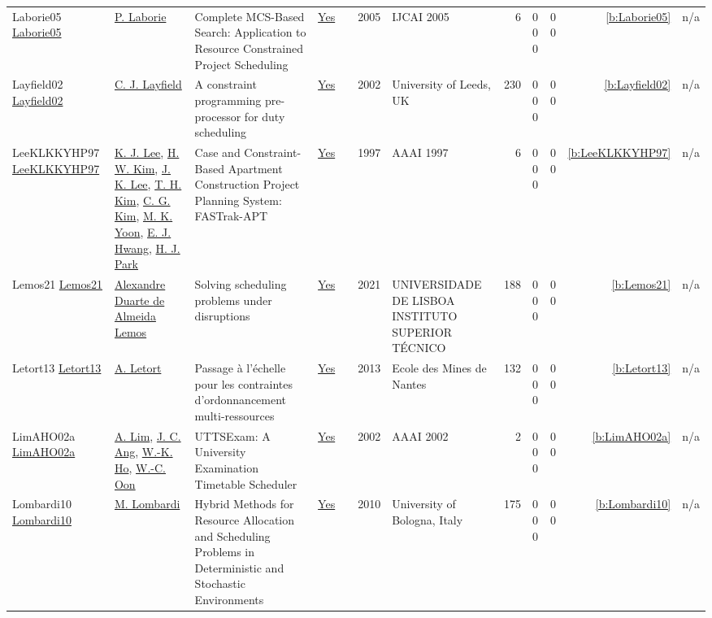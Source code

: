 {\begin{longtable}{>{\raggedright\arraybackslash}p{3cm}>{\raggedright\arraybackslash}p{4.5cm}>{\raggedright\arraybackslash}p{6.0cm}rrrp{2.5cm}rp{1cm}p{1cm}rr}
Laborie05 \href{http://ijcai.org/Proceedings/05/Papers/0571.pdf}{Laborie05} & \hyperref[auth:a118]{P. Laborie} & Complete MCS-Based Search: Application to Resource Constrained Project Scheduling & \href{../works/Laborie05.pdf}{Yes} & \cite{Laborie05} & 2005 & IJCAI 2005 & 6 & 0 0 0 & 0 0 & \ref{b:Laborie05} & n/a\\
Layfield02 \href{http://etheses.whiterose.ac.uk/1301/}{Layfield02} & \hyperref[auth:a670]{C. J. Layfield} & A constraint programming pre-processor for duty scheduling & \href{../works/Layfield02.pdf}{Yes} & \cite{Layfield02} & 2002 & University of Leeds, {UK} & 230 & 0 0 0 & 0 0 & \ref{b:Layfield02} & n/a\\
LeeKLKKYHP97 \href{http://www.aaai.org/Library/IAAI/1997/iaai97-182.php}{LeeKLKKYHP97} & \hyperref[auth:a1303]{K. J. Lee}, \hyperref[auth:a1304]{H. W. Kim}, \hyperref[auth:a1305]{J. K. Lee}, \hyperref[auth:a1306]{T. H. Kim}, \hyperref[auth:a1307]{C. G. Kim}, \hyperref[auth:a1308]{M. K. Yoon}, \hyperref[auth:a1309]{E. J. Hwang}, \hyperref[auth:a1310]{H. J. Park} & Case and Constraint-Based Apartment Construction Project Planning System: FASTrak-APT & \href{../works/LeeKLKKYHP97.pdf}{Yes} & \cite{LeeKLKKYHP97} & 1997 & AAAI 1997 & 6 & 0 0 0 & 0 0 & \ref{b:LeeKLKKYHP97} & n/a\\
Lemos21 \href{https://scholar.tecnico.ulisboa.pt/records/u5RPHM-pu_yoOLXJF7BHrgJx47D827b0xHb3}{Lemos21} & \hyperref[auth:a876]{Alexandre Duarte {de Almeida} Lemos} & Solving scheduling problems under disruptions & \href{../works/Lemos21.pdf}{Yes} & \cite{Lemos21} & 2021 & UNIVERSIDADE DE LISBOA INSTITUTO SUPERIOR TÉCNICO & 188 & 0 0 0 & 0 0 & \ref{b:Lemos21} & n/a\\
Letort13 \href{https://theses.hal.science/tel-00932215}{Letort13} & \hyperref[auth:a127]{A. Letort} & {Passage {\`a} l'{\'e}chelle pour les contraintes d'ordonnancement multi-ressources} & \href{../works/Letort13.pdf}{Yes} & \cite{Letort13} & 2013 & {Ecole des Mines de Nantes} & 132 & 0 0 0 & 0 0 & \ref{b:Letort13} & n/a\\
LimAHO02a \href{http://www.aaai.org/Library/AAAI/2002/aaai02-175.php}{LimAHO02a} & \hyperref[auth:a279]{A. Lim}, \hyperref[auth:a1334]{J. C. Ang}, \hyperref[auth:a1335]{W.-K. Ho}, \hyperref[auth:a1336]{W.-C. Oon} & UTTSExam: {A} University Examination Timetable Scheduler & \href{../works/LimAHO02a.pdf}{Yes} & \cite{LimAHO02a} & 2002 & AAAI 2002 & 2 & 0 0 0 & 0 0 & \ref{b:LimAHO02a} & n/a\\
Lombardi10 \href{http://amsdottorato.unibo.it/2961/}{Lombardi10} & \hyperref[auth:a142]{M. Lombardi} & Hybrid Methods for Resource Allocation and Scheduling Problems in Deterministic and Stochastic Environments & \href{../works/Lombardi10.pdf}{Yes} & \cite{Lombardi10} & 2010 & University of Bologna, Italy & 175 & 0 0 0 & 0 0 & \ref{b:Lombardi10} & n/a\\

\end{longtable}}
